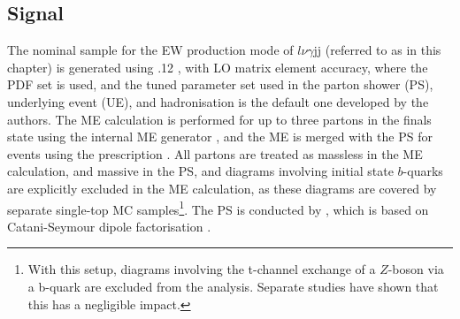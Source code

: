 
\subsection{Signal}

The nominal sample for the EW production mode of $l\nu\gamma$jj (referred to as \ewwy in this chapter) is generated using .12 \cite{Insitu:sherpa,Insitu:sherpa22}, with LO matrix element accuracy, where the \NNPDF PDF set \cite{Insitu:nnpdf} is used, and the tuned parameter set used in the parton shower (PS), underlying event (UE), and hadronisation is the default one developed by the \SHERPA authors. The ME calculation is performed for up to three partons in the finals state using the internal ME generator \COMIX \cite{Insitu:comix}, and the ME is merged with the PS for events using the \MEPSatLO prescription \cite{Insitu:meps}. All partons are treated as massless in the ME calculation, and massive in the PS, and diagrams involving initial state $b$-quarks are explicitly excluded in the ME calculation, as these diagrams are covered by separate single-top MC samples\footnote{With this setup, diagrams involving the t-channel exchange of a $Z$-boson via a b-quark are excluded from the analysis. Separate studies have shown that this has a negligible impact.}. The PS is conducted by \CSShower \cite{Insitu:csshower}, which is based on Catani-Seymour dipole factorisation \cite{Insitu:csalgorithm}. 

